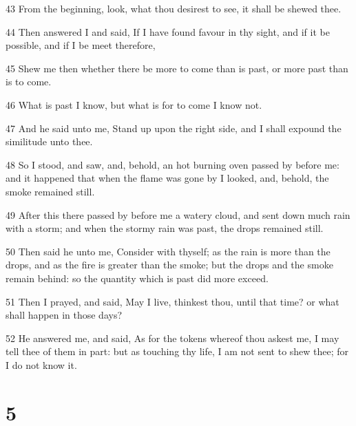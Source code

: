 \par 43 From the beginning, look, what thou desirest to see, it shall be shewed thee.
\par 44 Then answered I and said, If I have found favour in thy sight, and if it be possible, and if I be meet therefore,
\par 45 Shew me then whether there be more to come than is past, or more past than is to come.
\par 46 What is past I know, but what is for to come I know not.
\par 47 And he said unto me, Stand up upon the right side, and I shall expound the similitude unto thee.
\par 48 So I stood, and saw, and, behold, an hot burning oven passed by before me: and it happened that when the flame was gone by I looked, and, behold, the smoke remained still.
\par 49 After this there passed by before me a watery cloud, and sent down much rain with a storm; and when the stormy rain was past, the drops remained still.
\par 50 Then said he unto me, Consider with thyself; as the rain is more than the drops, and as the fire is greater than the smoke; but the drops and the smoke remain behind: so the quantity which is past did more exceed.
\par 51 Then I prayed, and said, May I live, thinkest thou, until that time? or what shall happen in those days?
\par 52 He answered me, and said, As for the tokens whereof thou askest me, I may tell thee of them in part: but as touching thy life, I am not sent to shew thee; for I do not know it.

\chapter{5}

